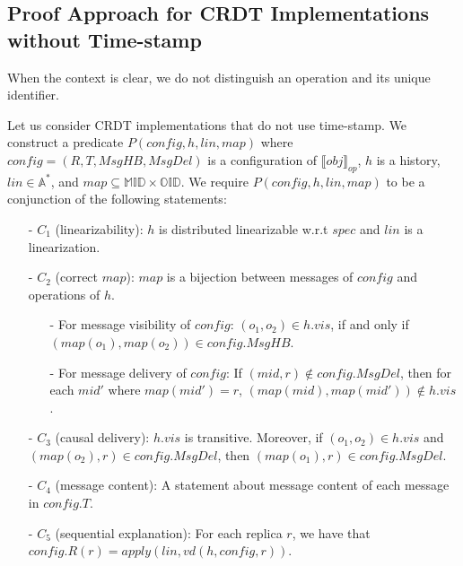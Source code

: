  




\subsection{Proof Approach for CRDT Implementations without Time-stamp}
\label{subsec:proof approach for CRDT implementations without time-stamp} 

When the context is clear, we do not distinguish an operation and its unique identifier.

Let us consider CRDT implementations that do not use time-stamp. We construct a predicate $P(\mathit{config},h,\mathit{lin},\mathit{map})$ where $\mathit{config} = (R,T,\mathit{MsgHB},\mathit{MsgDel})$ is a configuration of $\llbracket \mathit{obj} \rrbracket_{\mathit{op}}$, $h$ is a history, $\mathit{lin} \in \mathbb{A}^*$, and $\mathit{map} \subseteq \mathbb{MID} \times \mathbb{OID}$. We require $P(\mathit{config},h,\mathit{lin},\mathit{map})$ to be a conjunction of the following statements:

\begin{itemize}
\setlength{\itemsep}{0.5pt}
\item[-] $C_1$ (linearizability): $h$ is distributed linearizable w.r.t $\mathit{spec}$ and $\mathit{lin}$ is a linearization.

\item[-] $C_2$ (correct $\mathit{map}$): $\mathit{map}$ is a bijection between messages of $\mathit{config}$ and operations of $h$.

    \begin{itemize}
    \setlength{\itemsep}{0.5pt}
    \item[-] For message visibility of $\mathit{config}$: $(o_1,o_2) \in h.\mathit{vis}$, if and only if $(\mathit{map}(o_1),\mathit{map}(o_2)) \in \mathit{config}.\mathit{MsgHB}$.

    \item[-] For message delivery of $\mathit{config}$: If $(\mathit{mid},r) \notin \mathit{config}.\mathit{MsgDel}$, then for each $\mathit{mid}'$ where $\mathit{map}(\mathit{mid}') = r$, $(\mathit{map}(\mathit{mid}),\mathit{map}(\mathit{mid}')) \notin h.\mathit{vis}$.
    \end{itemize}

\item[-] $C_3$ (causal delivery): $h.\mathit{vis}$ is transitive. Moreover, if $(o_1,o_2) \in h.\mathit{vis}$ and $(\mathit{map}(o_2),r) \in \mathit{config}.\mathit{MsgDel}$, then $(\mathit{map}(o_1),r) \in \mathit{config}.\mathit{MsgDel}$.

\item[-] $C_4$ (message content): A statement about message content of each message in $\mathit{config}.T$.

\item[-] $C_5$ (sequential explanation): For each replica $r$, we have that $\mathit{config}.R(r) = \mathit{apply}(\mathit{lin},\mathit{vd}(h,\mathit{config},r))$.
\end{itemize}

